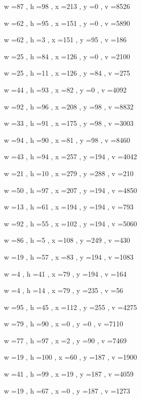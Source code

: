 \documentclass[11pt]{article}
\begin{document}
w =87 , h =98 , x =213 , y =0 , v =8526
\par
w =62 , h =95 , x =151 , y =0 , v =5890
\par
w =62 , h =3 , x =151 , y =95 , v =186
\par
w =25 , h =84 , x =126 , y =0 , v =2100
\par
w =25 , h =11 , x =126 , y =84 , v =275
\par
w =44 , h =93 , x =82 , y =0 , v =4092
\par
w =92 , h =96 , x =208 , y =98 , v =8832
\par
w =33 , h =91 , x =175 , y =98 , v =3003
\par
w =94 , h =90 , x =81 , y =98 , v =8460
\par
w =43 , h =94 , x =257 , y =194 , v =4042
\par
w =21 , h =10 , x =279 , y =288 , v =210
\par
w =50 , h =97 , x =207 , y =194 , v =4850
\par
w =13 , h =61 , x =194 , y =194 , v =793
\par
w =92 , h =55 , x =102 , y =194 , v =5060
\par
w =86 , h =5 , x =108 , y =249 , v =430
\par
w =19 , h =57 , x =83 , y =194 , v =1083
\par
w =4 , h =41 , x =79 , y =194 , v =164
\par
w =4 , h =14 , x =79 , y =235 , v =56
\par
w =95 , h =45 , x =112 , y =255 , v =4275
\par
w =79 , h =90 , x =0 , y =0 , v =7110
\par
w =77 , h =97 , x =2 , y =90 , v =7469
\par
w =19 , h =100 , x =60 , y =187 , v =1900
\par
w =41 , h =99 , x =19 , y =187 , v =4059
\par
w =19 , h =67 , x =0 , y =187 , v =1273
\par
\newpage
\end{document}
